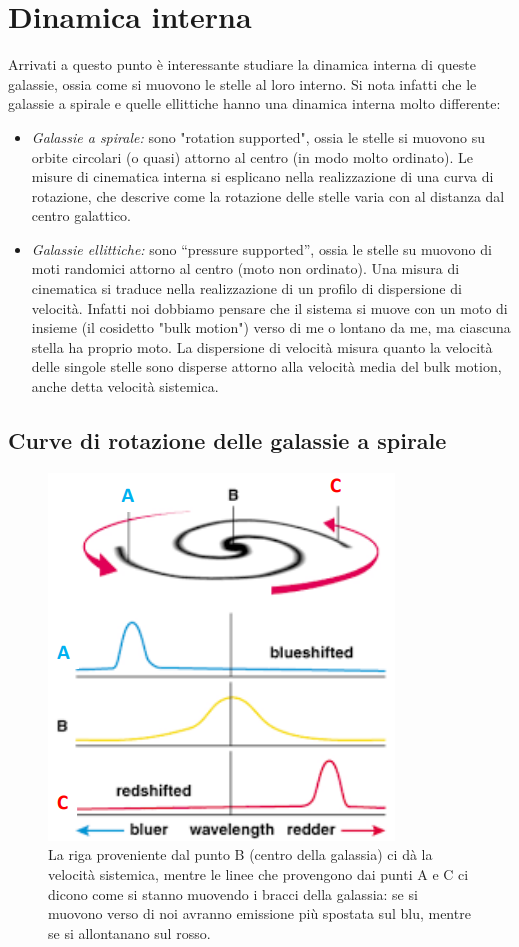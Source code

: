 \section{Dinamica interna}\label{sec:dinamica-interna}
Arrivati a questo punto è interessante studiare la dinamica interna di queste galassie, ossia come si muovono le stelle al loro interno. Si nota infatti che le galassie a spirale e quelle ellittiche hanno una dinamica interna molto differente:

\begin{itemize}
    \item \emph{Galassie a spirale:} sono "rotation supported", ossia le stelle si muovono su orbite circolari (o quasi) attorno al centro (in modo molto ordinato). Le misure di cinematica interna si esplicano nella realizzazione di una curva di rotazione, che descrive come la rotazione delle stelle varia con al distanza dal centro galattico.
    \item \emph{Galassie ellittiche:} sono “pressure supported”, ossia le stelle su muovono di moti randomici attorno al centro (moto non ordinato). Una misura di cinematica si traduce nella realizzazione di un profilo di dispersione di velocità. Infatti noi dobbiamo pensare che il sistema si muove con un moto di insieme (il cosidetto "bulk motion") verso di me o lontano da me, ma ciascuna stella ha proprio moto. La dispersione di velocità misura quanto la velocità delle singole stelle sono disperse attorno alla velocità media del bulk motion, anche detta velocità sistemica.
\end{itemize} 

\subsection{Curve di rotazione delle galassie a spirale}

\begin{figure}
    \centering
    \includegraphics[width = 0.4 \textwidth]{immagini/effetto-doppler.png}
    \caption{La riga proveniente dal punto B (centro della galassia) ci dà la velocità sistemica, mentre le linee che provengono dai punti A e C ci dicono come si stanno muovendo i bracci della galassia: se si muovono verso di noi avranno emissione più spostata sul blu, mentre se si allontanano sul rosso.}
    \label{fig:effetto-doppler-galassie}
\end{figure}

